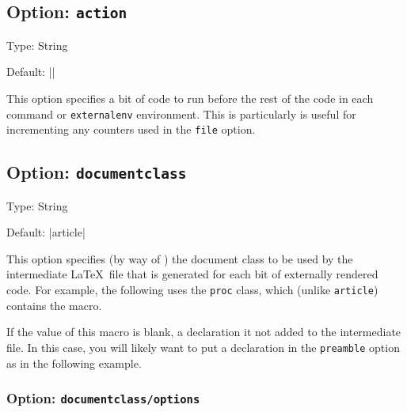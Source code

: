 \documentclass[10pt]{ltxdoc}
\newcommand{\env}[1]{\texttt{#1}}
\newcommand{\pkg}[1]{\texttt{#1}}
\newcommand{\opt}[1]{\texttt{#1}}
\begin{document}
\subsection{Option: \opt{action}}
\label{subsec:action}

Type: String

Default: ||

This option specifies a bit of code to run before the rest of the code
in each  command or \env{externalenv} environment.
This is particularly is useful for incrementing any counters used in
the \opt{file} option.

\begin{tcblisting}{}
{\thefoo}
{\thefoo}
\end{tcblisting}

\subsection{Option: \opt{documentclass}}
\label{subsec:documentclass}

Type: String

Default: |article|

This option specifies (by way of ) the document class
to be used by the intermediate \LaTeX\ file that is generated for each
bit of externally rendered code.
For example, the following uses the \pkg{proc} class, which (unlike
\pkg{article}) contains the  macro.

\begin{tcblisting}{}
\external[documentclass=proc]{\pagename}
\end{tcblisting}

If the value of this macro is blank, a  declaration
it not added to the intermediate file.
In this case, you will likely want to put a 
declaration in the \opt{preamble} option as in the following example.

\begin{tcblisting}{}
\external[documentclass={},preamble={\documentclass{proc}}]{\pagename}
\end{tcblisting}

\subsubsection{Option: \opt{documentclass/options}}
\label{subsec:documentclass/options}
\end{document}
